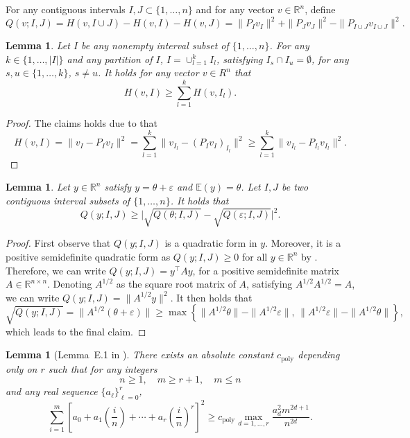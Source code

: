 \documentclass{article}
\newtheorem{lemma}[theorem]{Lemma}
\newcommand{\R}{{\mathbb R}}
\begin{document}
For any contiguous intervals $I, J \subset \{1, \ldots, n\}$ and for any vector $v \in \mathbb{R}^n$, define
	\[
		Q(v; I, J) = H(v, I \cup J) - H(v, I) - H(v, J) = \|P_I v_I\|^2 + \|P_J v_J\|^2 - \|P_{I \cup J} v_{I \cup J}\|^2.
	\]
	
\begin{lemma}\label{lem:1}
Let $I$ be any nonempty interval subset of $\{1, \ldots, n\}$.  For any $k \in \{1, \ldots, |I|\}$ and any partition of $I$, $I = \cup_{l = 1}^k I_l$, satisfying $I_s \cap I_u = \emptyset$, for any $s, u \in \{1, \ldots, k\}$, $s \neq u$.  It holds for any vector $v \in R^n$ that
	\[
		H(v, I) \geq \sum_{l = 1}^k H(v, I_l).
	\]
\end{lemma}

\begin{proof}
The claims holds due to that 
	\[
		H(v, I) = \|v_I - P_I v_I\|^2 = \sum_{l = 1}^k \|v_{I_l} - (P_I v_I)_{I_l}\|^2 \geq \sum_{l = 1}^k \|v_{I_l} - P_{I_l} v_{I_l}\|^2.
	\]
\end{proof}

\begin{lemma}\label{lem:2}
Let $y \in \mathbb{R}^n$ satisfy $y = \theta + \varepsilon$ and $\mathbb{E}(y) = \theta$.  Let $I, J$ be two contiguous interval subsets of $\{1, \ldots, n\}$.   It holds that
	\[
		Q(y; I, J) \geq \big|\sqrt{Q(\theta; I, J)} - \sqrt{Q(\varepsilon; I, J)}\big|^2.
	\]
\end{lemma}

\begin{proof}
First observe that $Q(y; I,J)$ is a quadratic form in $y$.  Moreover, it is a positive semidefinite quadratic form as $Q(y; I, J) \geq 0$ for all $y \in \R^n$ by .  Therefore, we can write $Q(y; I, J) = y^{\top} A y$, for a positive semidefinite matrix $A \in \mathbb{R}^{n \times n}$.  Denoting $A^{1/2}$ as the square root matrix of $A$, satisfying $A^{1/2} A^{1/2} = A$, we can write $Q(y; I, J) = \|A^{1/2} y\|^2$.   It then holds that
	\[
		\sqrt{Q(y;I,J)} = \|A^{1/2} (\theta + \varepsilon)\| \geq \max\left\{\|A^{1/2} \theta\| - \|A^{1/2} \varepsilon\|, \, \|A^{1/2} \varepsilon\| - \|A^{1/2} \theta\|\right\},
	\]
	which leads to the final claim.
\end{proof}

\begin{lemma}[Lemma~E.1 in \cite{shen2020phase}]\label{lem-shen2020}
There exists an absolute constant $c_{\mathrm{poly}}$ depending only on $r$ such that for any integers 
	\begin{equation}\label{eq-lem-e1-cond}
	n \geq 1, \quad m \geq r+1, \quad m \leq n
	\end{equation} 
	and any real sequence $\{a_{\ell}\}_{\ell = 0}^{r}$, 
	\[
		\sum_{i = 1}^{m} \left[a_0 + a_1 \left(\frac{i}{n}\right) + \cdots + a_{r} \left(\frac{i}{n}\right)^r\right]^2 \geq c_{\mathrm{poly}} \max_{d = 1, \ldots, r} \frac{a_d^2 m^{2d+1}}{n^{2d}}.
	\]
\end{lemma}
\end{document}
